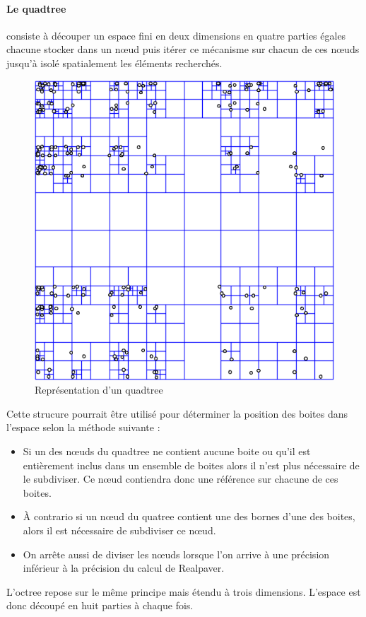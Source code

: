 \documentclass[11pt,a4paper,utf8x]{report}
\begin{document}
\paragraph{Le quadtree}consiste à découper un espace fini en deux dimensions en quatre parties égales chacune stocker dans un nœud puis itérer ce mécanisme sur chacun de ces nœuds jusqu'à isolé spatialement les éléments recherchés.
\begin{figure}[htbp]
\centering
\includegraphics[scale=0.30]{quadtree}
\caption{Représentation d'un quadtree}
\end{figure}
Cette strucure pourrait être utilisé pour déterminer la position des boites dans l'espace selon la méthode suivante :
\begin{itemize}
\item Si un des nœuds du quadtree ne contient aucune boite ou qu'il est entièrement inclus dans un ensemble de boites alors il n'est plus nécessaire de le subdiviser. Ce nœud contiendra donc une référence sur chacune de ces boites.
\item \`A contrario si un nœud du quatree contient une des bornes d'une des boites, alors il est nécessaire de subdiviser ce nœud.
\item On arrête aussi de diviser les nœuds lorsque l'on arrive à une précision inférieur à la précision du calcul de Realpaver.
\end{itemize}
L'octree repose sur le même principe mais étendu à trois dimensions. L'espace est donc découpé en huit parties à chaque fois.
\end{document}
